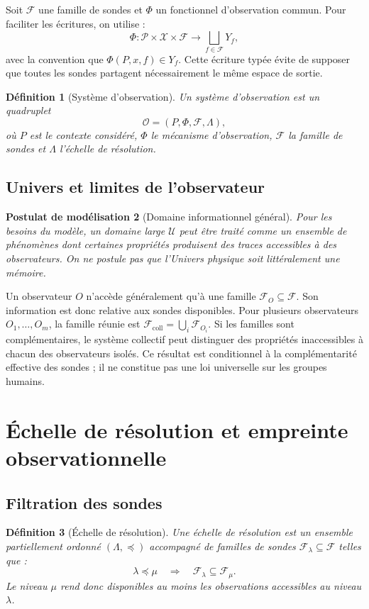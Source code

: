 \documentclass[11pt,a4paper]{article}
\newtheorem{definition}{Définition}[section]
\newtheorem{assumption}[definition]{Postulat de modélisation}
\theoremstyle{remark}
\newcommand{\X}{\mathcal X}
\newcommand{\Pctx}{\mathcal P}
\newcommand{\F}{\mathcal F}
\newcommand{\Lam}{\Lambda}
\newcommand{\1}{\mathbf 1}
\begin{document}
Soit $\F$ une famille de sondes et $\Phi$ un fonctionnel d'observation commun. Pour faciliter les écritures, on utilise :
\[
\Phi:\Pctx\times\X\times\F\to\bigsqcup_{f\in\F}Y_f,
\]
avec la convention que $\Phi(P,x,f)\in Y_f$. Cette écriture typée évite de supposer que toutes les sondes partagent nécessairement le même espace de sortie.

\begin{definition}[Système d'observation]
Un système d'observation est un quadruplet
\[
\mathscr O=(P,\Phi,\F,\Lam),
\]
où $P$ est le contexte considéré, $\Phi$ le mécanisme d'observation, $\F$ la famille de sondes et $\Lam$ l'échelle de résolution.
\end{definition}

\subsection{Univers et limites de l'observateur}
\begin{assumption}[Domaine informationnel général]
Pour les besoins du modèle, un domaine large $\mathcal U$ peut être traité comme un ensemble de phénomènes dont certaines propriétés produisent des traces accessibles à des observateurs. On ne postule pas que l'Univers physique soit littéralement une mémoire.
\end{assumption}

Un observateur $O$ n'accède généralement qu'à une famille $\F_O\subseteq\F$. Son information est donc relative aux sondes disponibles. Pour plusieurs observateurs $O_1,\ldots,O_m$, la famille réunie est $\F_{\mathrm{coll}}=\bigcup_i\F_{O_i}$. Si les familles sont complémentaires, le système collectif peut distinguer des propriétés inaccessibles à chacun des observateurs isolés. Ce résultat est conditionnel à la complémentarité effective des sondes ; il ne constitue pas une loi universelle sur les groupes humains.

\section{Échelle de résolution et empreinte observationnelle}

\subsection{Filtration des sondes}
\begin{definition}[Échelle de résolution]
Une échelle de résolution est un ensemble partiellement ordonné $(\Lam,\preceq)$ accompagné de familles de sondes $\F_\lambda\subseteq\F$ telles que :
\[
\lambda\preceq\mu\quad\Longrightarrow\quad \F_\lambda\subseteq\F_\mu.
\]
Le niveau $\mu$ rend donc disponibles au moins les observations accessibles au niveau $\lambda$.
\end{definition}
\end{document}
